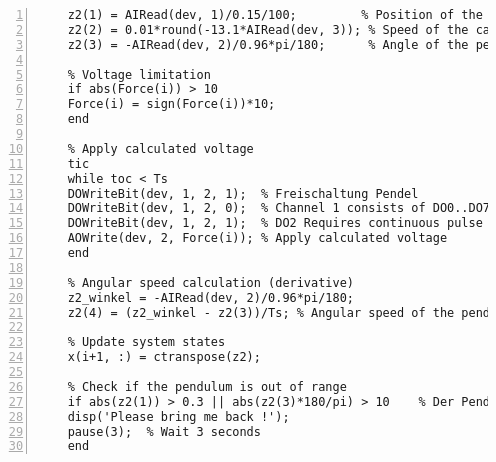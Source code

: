 \begin{lstlisting}[numbers=left,basicstyle=\scriptsize,caption={Source code of model predictive controller (Real implementation).},captionpos=b]
	% Save the data
	z2(1) = AIRead(dev, 1)/0.15/100;         % Position of the cart (meter)
	z2(2) = 0.01*round(-13.1*AIRead(dev, 3)); % Speed of the cart (m/s)
	z2(3) = -AIRead(dev, 2)/0.96*pi/180;      % Angle of the pendulum (radian)
	
	% Voltage limitation
	if abs(Force(i)) > 10
	Force(i) = sign(Force(i))*10; 
	end
	
	% Apply calculated voltage    
	tic
	while toc < Ts
	DOWriteBit(dev, 1, 2, 1);  % Freischaltung Pendel
	DOWriteBit(dev, 1, 2, 0);  % Channel 1 consists of DO0..DO7
	DOWriteBit(dev, 1, 2, 1);  % DO2 Requires continuous pulse
	AOWrite(dev, 2, Force(i)); % Apply calculated voltage
	end
	
	% Angular speed calculation (derivative) 
	z2_winkel = -AIRead(dev, 2)/0.96*pi/180;
	z2(4) = (z2_winkel - z2(3))/Ts; % Angular speed of the pendulum
	
	% Update system states
	x(i+1, :) = ctranspose(z2);
	
	% Check if the pendulum is out of range
	if abs(z2(1)) > 0.3 || abs(z2(3)*180/pi) > 10    % Der Pendel ist ausser Bereich
	disp('Please bring me back !');
	pause(3);  % Wait 3 seconds
	end
\end{lstlisting}